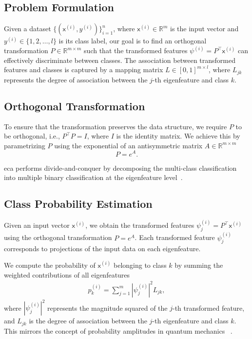 \documentclass[lettersize,journal]{IEEEtran}
\begin{document}
\subsection{Problem Formulation}
Given a dataset \( \{ (\mathsf{x}^{(i)}, y^{(i)}) \}_{i=1}^n \), where \( \mathsf{x}^{(i)} \in \mathbb{R}^m \) is the input vector and \( y^{(i)} \in \{1, 2, \dots, l\} \) is its class label, our goal is to find an orthogonal transformation \( P \in \mathbb{R}^{m \times m} \) such that the transformed features \( \psi^{(i)} = P^\top \mathsf{x}^{(i)} \) can effectively discriminate between classes. The association between transformed features and classes is captured by a mapping matrix \( L \in [0,1]^{m \times l} \), where \( L_{jk} \) represents the degree of association between the \( j \)-th eigenfeature and class \( k \).
\subsection{Orthogonal Transformation}
To ensure that the transformation preserves the data structure, we require \( P \) to be orthogonal, i.e., \( P^\top P = I \), where \( I \) is the identity matrix. We achieve this by parametrizing \( P \) using the exponential of an antisymmetric matrix \( A \in\mathbb{R}^{m \times m} \)~\cite{absil2008optimization}
\begin{equation}
P = e^{A}.
\end{equation}

\gls{eca} performs divide-and-conquer by decomposing the multi-class classification into multiple binary classification at the eigenfeature level~\cite{dietterich2000ensemble}. 

\subsection{Class Probability Estimation}

Given an input vector \( \mathsf{x}^{(i)} \), we obtain the transformed features \( \psi_j^{(i)} = P^\top \mathsf{x}^{(i)} \) using the orthogonal transformation \( P = e^A \). Each transformed feature \( \psi_j^{(i)} \) corresponds to projections of the input data on each eigenfeature.

We compute the probability of \( \mathsf{x}^{(i)} \) belonging to class \( k \) by summing the weighted contributions of all eigenfeatures
\begin{align}
    p_k^{(i)} = \sum_{j=1}^m |\psi_j^{(i)}|^2 L_{jk},
    \label{eq:map_matrix}
\end{align}
where \( |\psi_j^{(i)}|^2 \) represents the magnitude squared of the \( j \)-th transformed feature, and \( L_{jk} \) is the degree of association between the \( j \)-th eigenfeature and class \( k \). This mirrors the concept of probability amplitudes in quantum mechanics
~\cite{nielsen2010quantum}.
\end{document}
